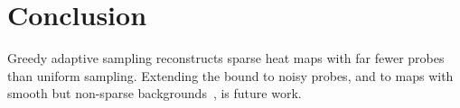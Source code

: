 \section{Conclusion}\label{sec:conclusion}
Greedy adaptive sampling reconstructs sparse heat maps with far fewer probes
than uniform sampling. Extending the bound to noisy probes, and to maps with
smooth but non-sparse backgrounds~\cite{wendland2004}, is future work.
